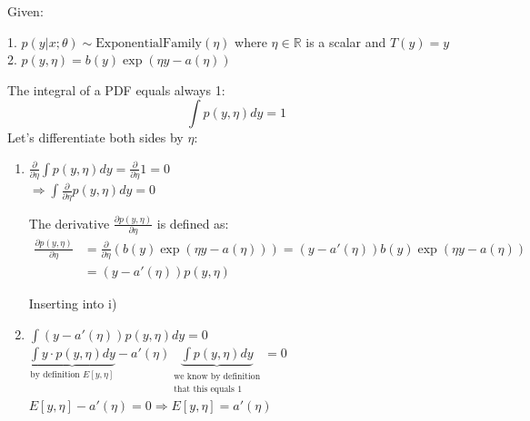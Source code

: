 \begin{answer}

Given:

1. $p(y|x; \theta) \sim \text{ExponentialFamily}(\eta)$ where $\eta \in \mathbb{R}$ is a scalar and $T(y)=y$ \\
2. $p(y, \eta) = b(y) \exp(\eta y - a(\eta))$

The integral of a PDF equals always 1:
\[ \int p(y, \eta) dy = 1 \]
Let's differentiate both sides by $\eta$:

\begin{enumerate}
\subsubsection*{}
    \item $\frac{\partial}{\partial \eta} \int p(y, \eta) dy = \frac{\partial}{\partial \eta} 1 = 0$ \\
    $\Rightarrow \int \frac{\partial}{\partial \eta} p(y, \eta) dy = 0$
    
    The derivative $\frac{\partial p(y, \eta)}{\partial \eta}$ is defined as:
    \begin{align*}
        \frac{\partial p(y, \eta)}{\partial \eta} &= \frac{\partial}{\partial \eta} (b(y) \exp(\eta y - a(\eta))) = (y - a'(\eta)) b(y) \exp(\eta y - a(\eta)) \\
        &= (y - a'(\eta)) p(y, \eta)
    \end{align*}
    
    Inserting into i)
    \item $\int (y - a'(\eta)) p(y, \eta) dy = 0$ \\

    $\underbrace{\int y \cdot p(y, \eta) dy}_{\text{by definition } E[y, \eta]} - a'(\eta) \underbrace{\int p(y, \eta) dy}_{\substack{\text{we know by definition} \\ \text{that this equals 1}}} = 0$ \\
    $E[y, \eta] - a'(\eta) = 0 \Rightarrow E[y, \eta] = a'(\eta)$
\end{enumerate}
\end{answer}
